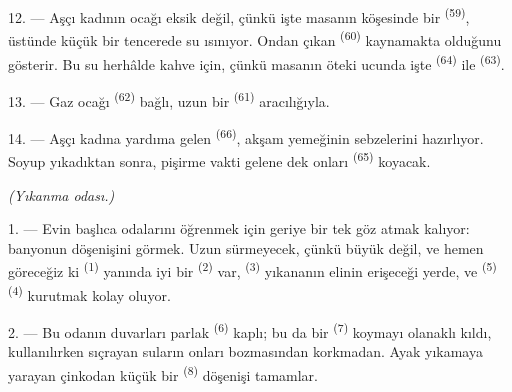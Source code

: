 12. --- Aşçı kadının ocağı eksik değil, çünkü işte masanın köşesinde bir
 \textsuperscript{(59)}, üstünde küçük bir tencerede su
ısınıyor. Ondan çıkan  \textsuperscript{(60)} kaynamakta
olduğunu gösterir. Bu su herhâlde kahve için, çünkü masanın öteki ucunda
işte  \textsuperscript{(64)} ile 
\textsuperscript{(63)}.

13. --- Gaz ocağı  \textsuperscript{(62)} bağlı, uzun
bir  \textsuperscript{(61)} aracılığıyla.

14. --- Aşçı kadına yardıma gelen  \textsuperscript{(66)},
akşam yemeğinin sebzelerini hazırlıyor. Soyup yıkadıktan sonra, pişirme vakti
gelene dek onları  \textsuperscript{(65)} koyacak.

\VUsaut{4.0mm}
{\centering\fontsize{10.2pt}{10.2pt}\selectfont{} \textit{(Yıkanma odası.)}\par}
\VUsaut{3.0mm}

1. --- Evin başlıca odalarını öğrenmek için geriye bir tek göz atmak kalıyor:
banyonun döşenişini görmek. Uzun sürmeyecek, çünkü büyük değil, ve hemen
göreceğiz ki  \textsuperscript{(1)} yanında iyi bir
 \textsuperscript{(2)} var, 
\textsuperscript{(3)} yıkananın elinin erişeceği yerde, ve
 \textsuperscript{(5)} 
\textsuperscript{(4)} kurutmak kolay oluyor.

2. --- Bu odanın duvarları parlak  \textsuperscript{(6)}
kaplı; bu da bir  \textsuperscript{(7)} koymayı olanaklı kıldı,
kullanılırken sıçrayan suların onları bozmasından korkmadan. Ayak yıkamaya
yarayan çinkodan küçük bir  \textsuperscript{(8)} döşenişi
tamamlar.
\VUsaut{6.0mm}
\VUfilet{22mm}
